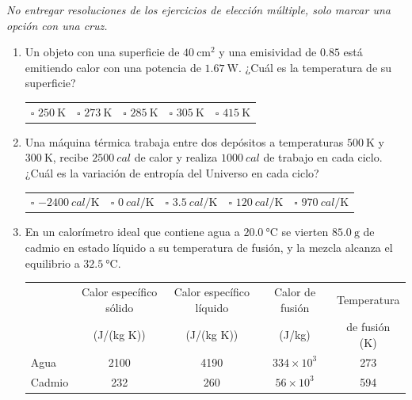\documentclass[a4paper,11pt,dvipsnames]{article}
\begin{document}


\textit{No entregar resoluciones de los ejercicios de elección múltiple, solo marcar una opción con una cruz.}

\begin{enumerate}[leftmargin=*]
  \item Un objeto con una superficie de $\SI{40}{\centi\metre\squared}$ y una emisividad de $0.85$ está emitiendo calor con una potencia de $\SI{1.67}{\watt}$. ¿Cuál es la temperatura de su superficie?\\[5pt]
  \begin{tabularx}{\textwidth}{XXXXX}
    $\square$ $\SI{250}{\kelvin}$ & $\square$ $\SI{273}{\kelvin}$ & $\square$ $\SI{285}{\kelvin}$ & $\square$ $\SI{305}{\kelvin}$ & $\square$ $\SI{415}{\kelvin}$ \\
  \end{tabularx}
  
  \item Una máquina térmica trabaja entre dos depósitos a temperaturas $\SI{500}{\kelvin}$ y $\SI{300}{\kelvin}$, recibe $\SI{2500}{cal}$ de calor y realiza $\SI{1000}{cal}$ de trabajo en cada ciclo. ¿Cuál es la variación de entropía del Universo en cada ciclo?\\[5pt]
  \begin{tabularx}{\textwidth}{XXXXX}
    $\square$ $\SI{-2400}{cal/\kelvin}$ & $\square$ $\SI{0}{cal/\kelvin}$ & $\square$ $\SI{3.5}{cal/\kelvin}$ & $\square$ $\SI{120}{cal/\kelvin}$ & $\square$ $\SI{970}{cal/\kelvin}$\\
  \end{tabularx}
  
  
  \item En un calorímetro ideal que contiene agua a $\SI{20.0}{\celsius}$ se vierten $\SI{85.0}{\gram}$ de cadmio en estado líquido a su temperatura de fusión, y la mezcla alcanza el equilibrio a $\SI{32.5}{\celsius}$.

  {\small
  \begin{tabular}{lcccc}
  \toprule
  &Calor específico sólido&Calor específico líquido&Calor de fusión&Temperatura\\
  &(J/(kg K))&(J/(kg K))&(J/kg)&de fusión (K)\\
  \midrule
  Agua&2100&4190&$334\times 10^3$&273\\
  Cadmio&232&260&$56\times 10^3$&594\\
  \bottomrule
  \end{tabular}
  }


\end{enumerate}
\end{document}
